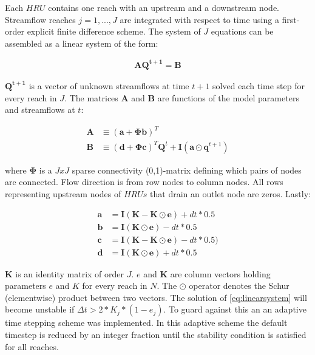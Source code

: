 Each $HRU$ contains one reach with an upstream and a downstream node. Streamflow reaches $j=1,...,J$ are integrated with respect to time using a first-order explicit finite difference scheme. The system of $J$ equations can be assembled as a linear system of the form:   

\begin{align}\label{eq:linearsystem}
\mathbf{A}\mathbf{Q^{t+1}} = \mathbf{B}
\end{align}

$\mathbf{Q^{t+1}}$ is a vector of unknown streamflows at time $t+1$ solved each time step for every reach in $J$. The matrices $\mathbf{A}$ and $\mathbf{B}$ are functions of the model parameters and streamflows at $t$:

\begin{align}
\mathbf{A}&\equiv (\mathbf{a} + \mathbf{\Phi} \mathbf{b})^T\\
\mathbf{B}&\equiv (\mathbf{d} + \mathbf{\Phi}\mathbf{c})^T\mathbf{Q}^t + \mathbf{I}(\mathbf{a\odot q}^{t+1})
\end{align}

where $\mathbf{\Phi}$ is a $JxJ$ sparse connectivity (0,1)-matrix defining which pairs of nodes are connected. Flow direction is from row nodes to column nodes. All rows representing upstream nodes of $HRUs$ that drain an outlet node are zeros. Lastly:

\begin{align}
\mathbf{a} &= \mathbf{I} (\mathbf{K}-\mathbf{K\odot e}) + dt * 0.5\\
\mathbf{b} &= \mathbf{I} (\mathbf{K\odot e}) - dt * 0.5\\
\mathbf{c} &= \mathbf{I} (\mathbf{K}-\mathbf{K\odot e}) - dt * 0.5)\\
\mathbf{d} &= \mathbf{I} (\mathbf{K\odot e}) + dt * 0.5
\end{align}


$\mathbf{K}$ is an identity matrix of order $J$. $e$ and $\mathbf{K}$ are column vectors holding parameters $e$ and $K$ for every reach in $N$. The $\odot$ operator denotes the Schur (elementwise) product between two vectors. The solution of \eqref{eq:linearsystem} will become unstable if $\Delta t > 2 * K_j * (1 - e_j)$. To guard against this an an adaptive time stepping scheme was implemented. In this adaptive scheme the default timestep is reduced by an integer fraction until the stability condition is satisfied for all reaches.



